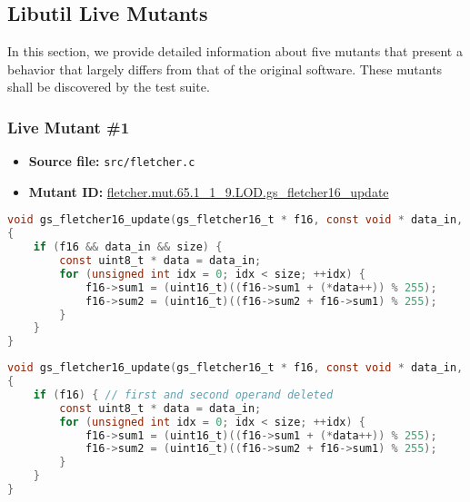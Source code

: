 \subsection{Libutil Live Mutants}

In this section, we provide detailed information about five mutants that present a behavior that largely differs from that of the original software. These mutants shall be discovered by the test suite.

\subsubsection{Live Mutant \#1}

\begin{itemize}
\item \textbf{Source file:} \texttt{src/fletcher.c}
\item \textbf{Mutant ID:} \url{fletcher.mut.65.1_1_9.LOD.gs_fletcher16_update}
\end{itemize}

\begin{lstlisting}[language=C, label=live_1, caption=Original source code.]
void gs_fletcher16_update(gs_fletcher16_t * f16, const void * data_in, size_t size)
{
    if (f16 && data_in && size) {
        const uint8_t * data = data_in;
        for (unsigned int idx = 0; idx < size; ++idx) {
            f16->sum1 = (uint16_t)((f16->sum1 + (*data++)) % 255);
            f16->sum2 = (uint16_t)((f16->sum2 + f16->sum1) % 255);
        }
    }
}
\end{lstlisting}

\begin{lstlisting}[language=C, label=live_1, caption=Mutant source code.]
void gs_fletcher16_update(gs_fletcher16_t * f16, const void * data_in, size_t size)
{
    if (f16) { // first and second operand deleted
        const uint8_t * data = data_in;
        for (unsigned int idx = 0; idx < size; ++idx) {
            f16->sum1 = (uint16_t)((f16->sum1 + (*data++)) % 255);
            f16->sum2 = (uint16_t)((f16->sum2 + f16->sum1) % 255);
        }
    }
}
\end{lstlisting}




